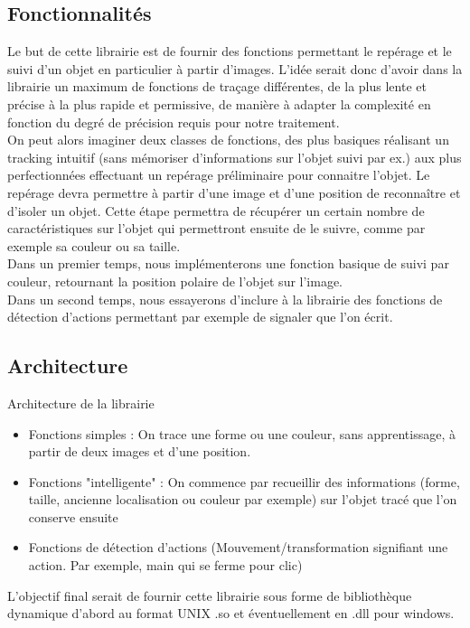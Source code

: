 \documentclass{article}
\begin{document}
		\subsection{Fonctionnalités}
			Le but de cette librairie est de fournir des fonctions permettant le repérage et le suivi d'un objet en particulier à partir d'images. 
			L'idée serait donc d'avoir dans la librairie un maximum de fonctions de traçage différentes, de la plus lente et précise à la plus rapide et permissive, de manière à adapter la complexité en fonction du degré de précision requis pour notre traitement. \\
			On peut alors imaginer deux classes de fonctions, des plus basiques réalisant un tracking intuitif (sans mémoriser d'informations sur l'objet suivi par ex.) aux plus perfectionnées effectuant un repérage préliminaire pour connaitre l'objet.
			Le repérage devra permettre à partir d'une image et d'une position de reconnaître et d'isoler un objet. Cette étape permettra de récupérer un certain nombre de caractéristiques sur l'objet qui permettront ensuite de le suivre, comme par exemple sa couleur ou sa taille. \\
Dans un premier temps, nous implémenterons une fonction basique de suivi par couleur, retournant la position polaire de l'objet sur l'image. \\
Dans un second temps, nous essayerons d'inclure à la librairie des fonctions de détection d'actions permettant par exemple de signaler que l'on écrit. 
		\subsection{Architecture}
			Architecture de la librairie 
			\begin{itemize}
				\item Fonctions simples : On trace une forme ou une couleur, sans apprentissage, à partir de deux images et d'une position.
				\item Fonctions "intelligente" : On commence par recueillir des informations (forme, taille, ancienne localisation ou couleur par exemple) sur l'objet tracé que l'on conserve ensuite    
				\item Fonctions de détection d'actions (Mouvement/transformation signifiant une action. Par exemple, main qui se ferme pour clic)
			\end{itemize}
			L'objectif final serait de fournir cette librairie sous forme de bibliothèque dynamique d'abord au format UNIX .so et éventuellement en .dll pour windows. 
\end{document}
